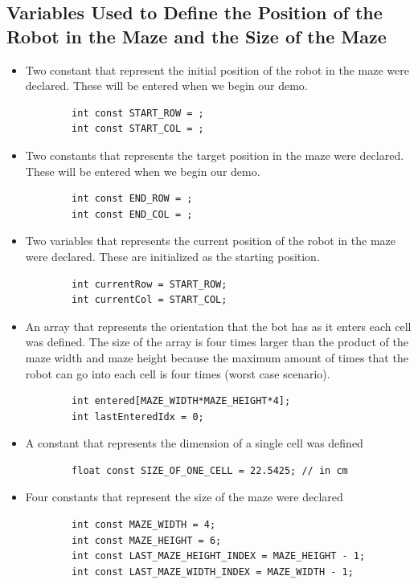 \documentclass[11pt]{article}
\begin{document}
\subsection{Variables Used to Define the Position of the Robot in the Maze and the Size of the Maze}
\begin{itemize}
\item Two constant that represent the initial position of the robot in the maze were declared. These will be entered when we begin our demo.
	\begin{verbatim}
		int const START_ROW = ;
		int const START_COL = ;
	\end{verbatim} 
\item Two constants that represents the target position in the maze were declared. These will be entered when we begin our demo.
	\begin{verbatim}
		int const END_ROW = ; 
		int const END_COL = ;
	\end{verbatim}
\item Two variables that represents the current position of the robot in the maze were declared. These are  initialized as the starting position. 
	\begin{verbatim}
		int currentRow = START_ROW;
		int currentCol = START_COL;
	\end{verbatim} 
\item An array that represents the orientation that the bot has as it enters each cell was defined. The size of the array is four times larger than the product of the maze width and maze height because the maximum amount of times that the robot can go into each cell is four times (worst case scenario).
	\begin{verbatim}
		int entered[MAZE_WIDTH*MAZE_HEIGHT*4];
		int lastEnteredIdx = 0;
	\end{verbatim} 
\item A constant that represents the dimension of a single cell was defined
	\begin{verbatim}
		float const SIZE_OF_ONE_CELL = 22.5425; // in cm 	
	\end{verbatim} 
\item Four constants that represent the size of the maze were declared
	\begin{verbatim}
		int const MAZE_WIDTH = 4;
		int const MAZE_HEIGHT = 6;
		int const LAST_MAZE_HEIGHT_INDEX = MAZE_HEIGHT - 1;
		int const LAST_MAZE_WIDTH_INDEX = MAZE_WIDTH - 1;
	\end{verbatim} 
\end{itemize}
\newpage
\end{document}
